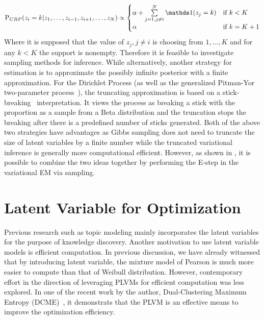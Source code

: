 \begin{eqnarray}
  \P_{CRP}(z_i = k | z_1, \dots, z_{i-1}, z_{i+1}, \dots, z_N)
    \propto
      \begin{cases}
        \alpha + \sum\limits_{j = 1, j \neq i}^N \indct( z_j = k )
        & \text{if $k < K$} \\
        \alpha
        & \text{if $k = K + 1$}
      \end{cases} \\
\end{eqnarray}
Where it is supposed that the value of $z_j, j \neq i$ is choosing from $1,
\dots, K$  and for any $k < K$ the support is nonempty. Therefore it is feasible
to investigate sampling methods for inference. While alternatively, another
strategy for estimation is to approximate the possibly infinite posterior with a
finite approximation. For the Dirichlet Process (as well as the generalized
Pitman-Yor two-parameter process~\cite{pitman1997two}), the truncating
approximation is based on a stick-breaking~\cite{ishwaran2011gibbs}
interpretation. It views the process as breaking a stick with the proportion as
a sample from a Beta distribution and the truncation stops the breaking after
there is a predefined number of sticks generated. Both of the above two
strategies have advantages as Gibbs sampling does not need to truncate the size
of latent variables by a finite number while the truncated variational inference
is generally more computational efficient. However, as shown in
\cite{wang2012truncation}, it is possible to combine the two ideas together by
performing the E-step in the variational EM via sampling.

\section{Latent Variable for Optimization}

Previous research such as topic modeling mainly incorporates the latent
variables for the purpose of knowledge discovery. Another motivation to use
latent variable models is efficient computation. In previous discussion, we have
already witnessed that by introducing latent variable, the mixture model of
Pearson is much more easier to compute than that of Weibull distribution.
However, contemporary effort in the direction of leveraging PLVMs for efficient
computation was less explored. In one of the recent work by the author,
Dual-Clustering Maximum Entropy (DCME)~\cite{wang2016dcme}, it demonstrats that
the PLVM is an effective means to improve the optimization efficiency.

